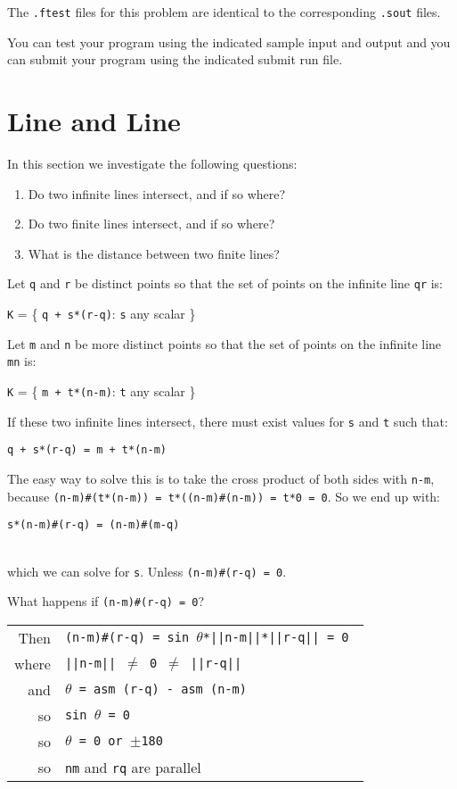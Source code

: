 \documentclass[12pt]{article}
\begin{document}
The {\tt .ftest} files for this problem are identical
to the corresponding {\tt .sout} files.

You can test your program using the indicated sample input and
output and you can submit your program using the indicated submit
run file.

\newpage


\section{Line and Line}
In this section we investigate the following questions:
\begin{enumerate}
\item Do two infinite lines intersect, and if so where?
\item Do two finite lines intersect, and if so where?
\item What is the distance between two finite lines?
\end{enumerate}

Let {\tt q} and {\tt r} be distinct points so that the set
of points on the infinite line {\tt qr} is: \\
\centerline{{\tt K} = \{ {\tt q + s*(r-q)}: {\tt s} any scalar \}} 

Let {\tt m} and {\tt n} be more distinct points so that the set
of points on the infinite line {\tt mn} is: \\
\centerline{{\tt K} = \{ {\tt m + t*(n-m)}: {\tt t} any scalar \}} 

If these two infinite lines intersect, there must exist values for
{\tt s} and {\tt t} such that: \\
\centerline{{\tt q + s*(r-q) = m + t*(n-m)}}

The easy way to solve this is to take the cross product of both
sides with {\tt n-m}, because
{\tt (n-m)\#(t*(n-m)) = t*((n-m)\#(n-m)) = t*0 = 0}.
So we end up with: \\
\centerline{\tt s*(n-m)\#(r-q) = (n-m)\#(m-q)} \\
which we can solve for {\tt s}.  Unless {\tt (n-m)\#(r-q) = 0}.

What happens if {\tt (n-m)\#(r-q) = 0}? \\
\hspace*{0.3in}\begin{tabular}{r@{~~}l}
Then    & \tt (n-m)\#(r-q) = sin $\theta$*||n-m||*||r-q|| = 0 \\
where   & \tt ||n-m|| $\neq$ 0 $\neq$ ||r-q|| \\
and     & \tt $\theta$ = asm (r-q) - asm (n-m) \\
so      & \tt sin $\theta$ = 0 \\
so      & \tt $\theta$ = 0 or $\pm$180 \\
so      & {\tt nm} and {\tt rq} are parallel \\
        \end{tabular}
\end{document}
